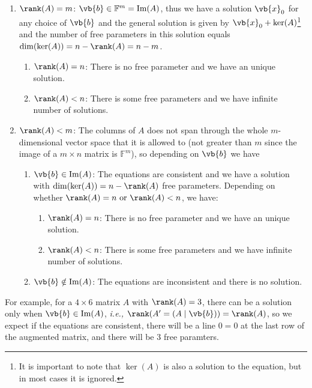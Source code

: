 \documentclass[a4paper,12pt]{report}
\begin{document}
\begin{enumerate}
    \item \(\rank (A) = m\): \(\vb{b} \in \mathbb{F}^{m} = \text{Im} (A)\), thus we have a solution \(\vb{x} _{0} \) for any choice of \(\vb{b} \) and the general solution is given by \(\vb{x} _{0} + \ker (A) \)\footnote{It is important to note that \(\ker (A)\) is also a solution to the equation, but in most cases it is ignored.} and the number of free parameters in this solution equals \(\dim (\ker (A)) = n - \rank (A) = n-m\).   
    \begin{enumerate}
        \item \(\rank (A) = n\): There is no free parameter and we have an unique solution.
        \item \(\rank (A) < n\): There is some free parameters and we have infinite number of solutions.  
    \end{enumerate}  
    \item \(\rank (A) < m\): The columns of \(A\) does not span through the whole \(m\)-dimensional vector space that it is allowed to (not greater than \(m\) since the image of a \(m \times n\) matrix is \(\mathbb{F}^{m} \)), so depending on \(\vb{b} \) we have \begin{enumerate}
        \item \(\vb{b} \in  \text{Im}(A) \): The equations are consistent and we have a solution with \(\dim (\ker (A)) = n - \rank (A)\) free parameters. Depending on whether \(\rank (A) = n \text { or } \rank (A) < n\), we have: 
        \begin{enumerate}
            \item \(\rank (A) = n\): There is no free parameter and we have an unique solution.
            \item \(\rank (A) < n\): There is some free parameters and we have infinite number of solutions.  
        \end{enumerate}
        \item \(\vb{b} \notin \text{Im}(A) \): The equations are inconsistent and there is no solution.  
    \end{enumerate}  
\end{enumerate}

For example, for a \(4 \times 6\) matrix \(A\) with \(\rank (A) = 3\), there can be a solution only when \(\vb{b} \in  \text{Im}(A) \), \textit{i.e.,} \(\rank (A' = (A \mid \vb{b} )) = \rank (A)\), so we expect if the equations are consistent, there will be a line \(0 = 0\) at the last row of the augmented matrix, and there will be 3 free paramters.     
\end{document}
